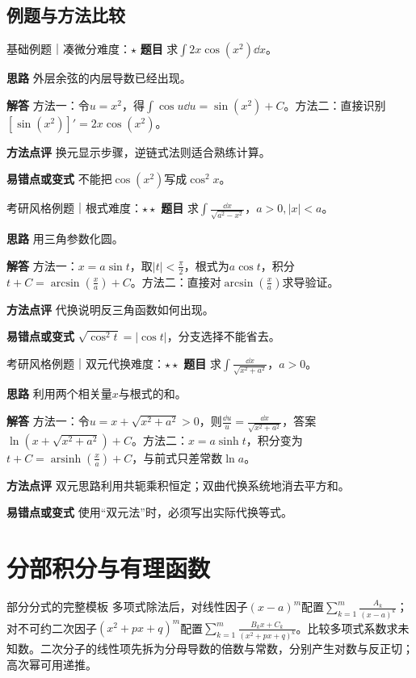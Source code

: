 \subsection{例题与方法比较}
\begin{example}{基础例题｜凑微分}{难度：$\star$}
\label{ex:3:1}\textbf{题目} 求$\int2x\cos(x^2)\dd x$。\par
\textbf{思路} 外层余弦的内层导数已经出现。\par
\textbf{解答} 方法一：令$u=x^2$，得$\int\cos u\dd u=\sin(x^2)+C$。方法二：直接识别$[\sin(x^2)]\prime=2x\cos(x^2)$。\par
\textbf{方法点评} 换元显示步骤，逆链式法则适合熟练计算。\par
\textbf{易错点或变式} 不能把$\cos(x^2)$写成$\cos^2x$。
\end{example}
\begin{example}{考研风格例题｜根式}{难度：$\star\star$}
\label{ex:3:2}\textbf{题目} 求$\int\frac{\dd x}{\sqrt{a^2-x^2}}$，$a>0,|x|<a$。\par
\textbf{思路} 用三角参数化圆。\par
\textbf{解答} 方法一：$x=a\sin t$，取$|t|<\frac{\pi}{2}$，根式为$a\cos t$，积分$t+C=\arcsin(\frac{x}{a})+C$。方法二：直接对$\arcsin(\frac{x}{a})$求导验证。\par
\textbf{方法点评} 代换说明反三角函数如何出现。\par
\textbf{易错点或变式} $\sqrt{\cos^2t}=|\cos t|$，分支选择不能省去。
\end{example}
\begin{example}{考研风格例题｜双元代换}{难度：$\star\star$}
\label{ex:3:3}\textbf{题目} 求$\int\frac{\dd x}{\sqrt{x^2+a^2}}$，$a>0$。\par
\textbf{思路} 利用两个相关量$x$与根式的和。\par
\textbf{解答} 方法一：令$u=x+\sqrt{x^2+a^2}>0$，则$\frac{\dd u}{u}=\frac{\dd x}{\sqrt{x^2+a^2}}$，答案$\ln(x+\sqrt{x^2+a^2})+C$。方法二：$x=a\sinh t$，积分变为$t+C=\operatorname{arsinh}(\frac{x}{a})+C$，与前式只差常数$\ln a$。\par
\textbf{方法点评} 双元思路利用共轭乘积恒定；双曲代换系统地消去平方和。\par
\textbf{易错点或变式} 使用“双元法”时，必须写出实际代换等式。
\end{example}
\section{分部积分与有理函数}\label{sec:3:2}

\begin{method}{部分分式的完整模板}
多项式除法后，对线性因子$(x-a)^m$配置$\sum_{k=1}^m \frac{A_k}{(x-a)^k}$；对不可约二次因子$(x^2+px+q)^m$配置$\sum_{k=1}^m\frac{B_kx+C_k}{(x^2+px+q)^k}$。比较多项式系数求未知数。二次分子的线性项先拆为分母导数的倍数与常数，分别产生对数与反正切；高次幂可用递推。
\end{method}

